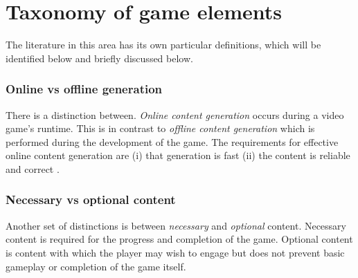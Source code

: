 \documentclass[11pt, a4paper, oneside]{report} %
\begin{document}







\section{Taxonomy of game elements}

The literature in this area has its own particular definitions, which will be
identified below and briefly discussed below.

\subsubsection{Online vs offline generation}

There is a distinction between. \textit{Online content generation} occurs during
a video game's runtime. This is in contrast to \textit{offline content
generation} which is performed during the development of the game. The
requirements for effective online content generation are (i) that generation is
fast (ii) the content is reliable and correct \cite{5756645}.

\subsubsection{Necessary vs optional content}

Another set of distinctions is between \textit{necessary} and \textit{optional}
content. Necessary content is required for the progress and completion of the
game. Optional content is content with which the player may wish to engage but
does not prevent basic gameplay or completion of the game itself.
\end{document}

